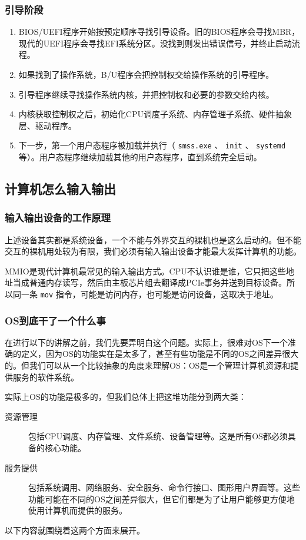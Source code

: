 \documentclass[fontset=none,aspectratio=1610]{ctexbeamer}
\begin{document}
\begin{frame}
    \frametitle{引导阶段}

    \begin{enumerate}
        \item BIOS/UEFI程序开始按预定顺序寻找引导设备。旧的BIOS程序会寻找MBR，现代的UEFI程序会寻找EFI系统分区。没找到则发出错误信号，并终止启动流程。
        \item 如果找到了操作系统，B/U程序会把控制权交给操作系统的引导程序。
        \item 引导程序继续寻找操作系统内核，并把控制权和必要的参数交给内核。
        \item 内核获取控制权之后，初始化CPU调度子系统、内存管理子系统、硬件抽象层、驱动程序。
        \item 下一步，第一个用户态程序被加载并执行（ \texttt{smss.exe} 、 \texttt{init} 、 \texttt{systemd} 等）。用户态程序继续加载其他的用户态程序，直到系统完全启动。
    \end{enumerate}

\end{frame}

\subsection{计算机怎么输入输出}

\begin{frame}
    \frametitle{输入输出设备的工作原理}

    上述设备其实都是系统设备，一个不能与外界交互的裸机也是这么启动的。但不能交互的裸机用处较为有限，我们必须有输入输出设备才能最大发挥计算机的功能。

    MMIO是现代计算机最常见的输入输出方式。CPU不认识谁是谁，它只把这些地址当成普通内存读写，然后由主板芯片组去翻译成PCIe事务并送到目标设备。所以同一条 \texttt{mov} 指令，可能是访问内存，也可能是访问设备，这取决于地址。

\end{frame}

\begin{frame}
    \frametitle{OS到底干了一个什么事}

    在进行以下的讲解之前，我们先要弄明白这个问题。实际上，很难对OS下一个准确的定义，因为OS的功能实在是太多了，甚至有些功能是不同的OS之间差异很大的。但我们可以从一个比较抽象的角度来理解OS：OS是一个管理计算机资源和提供服务的软件系统。

    实际上OS的功能是极多的，但我们总体上把这堆功能分到两大类：
    \begin{description}
        \item[资源管理] 包括CPU调度、内存管理、文件系统、设备管理等。这是所有OS都必须具备的核心功能。
        \item[服务提供] 包括系统调用、网络服务、安全服务、命令行接口、图形用户界面等。这些功能可能在不同的OS之间差异很大，但它们都是为了让用户能够更方便地使用计算机而提供的服务。
    \end{description}

    以下内容就围绕着这两个方面来展开。

\end{frame}
\end{document}
